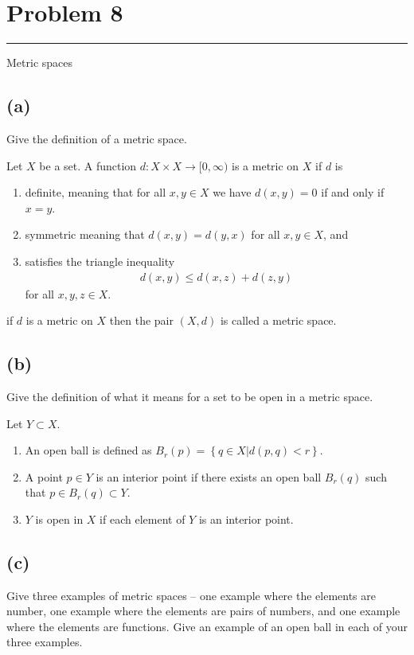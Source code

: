 \documentclass[12pt]{amsart}
\newcommand{\usec}[1]{%
  \section*{#1}%
  \noindent\rule{\textwidth}{2pt}%
  \vspace{10pt}%
}
\newcommand{\gtodo}[1]{\todo[inline, color=green]{#1}}
\begin{document}
  \gtodo{More?}

  \usec{Problem 8}%
  \label{sec:problem_8}

  Metric spaces

  \subsection*{(a)}%
  \label{sub:_a_}

  Give the definition of a metric space.

  Let $X$ be a set. A function $d:X\times X\to[0,\infty)$ is a metric on $X$ if
  $d$ is
  \begin{enumerate}
    \item definite, meaning that for all $x,y\in X$ we have $d(x,y)=0$ if and
      only if $x=y$.
    \item symmetric meaning that $d(x,y)=d(y,x)$ for all $x,y\in X$, and
    \item satisfies the triangle inequality
      \begin{align*}
        d(x,y)\leq d(x,z)+d(z,y)
      \end{align*}
      for all $x,y,z\in X$.
  \end{enumerate}
  if $d$ is a metric on $X$ then the pair $(X,d)$ is called a metric space.

  \subsection*{(b)}%
  \label{sub:_b_}

  Give the definition of what it means for a set to be open in a metric space.

  Let $Y\subset X$.
  \begin{enumerate}
    \item An open ball is defined as $B_r(p)=\left\{q\in X\vert
      d(p,q)<r\right\}$.
    \item A point $p\in Y$ is an interior point if there exists an open ball
      $B_r(q)$ such that $p\in B_r(q)\subset Y$.
    \item $Y$ is open in $X$ if each element of $Y$ is an interior point.
  \end{enumerate}

  \subsection*{(c)}%
  \label{sub:_c_}

  Give three examples of metric spaces -- one example where the elements are
  number, one example where the elements are pairs of numbers, and one example
  where the elements are functions. Give an example of an open ball in each of
  your three examples.
\end{document}
